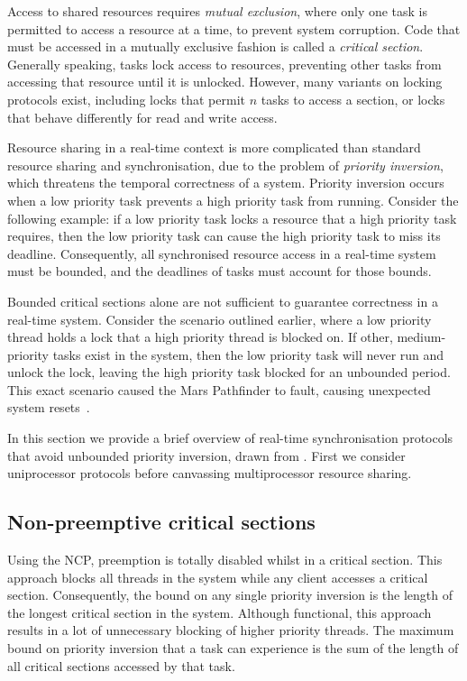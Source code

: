 Access to shared resources requires \emph{mutual exclusion}, where only one 
task is permitted to access a resource at a time, to prevent system corruption. Code that
must be accessed in a mutually exclusive fashion is called a \emph{critical section}. Generally
speaking, tasks lock access to resources, preventing other tasks from accessing that resource
until it is unlocked. However, many variants on locking protocols exist, including locks that permit
$n$ tasks to access a section, or locks that behave differently for read and write access.

Resource sharing in a real-time context is more complicated than standard resource sharing and
synchronisation, due to the problem of \emph{priority inversion}, which threatens the temporal
correctness of a system.  Priority inversion occurs when a low priority task prevents a high
priority task from running.  Consider the following example: if a low priority task locks a resource
that a high priority task requires, then the low priority task can cause the high priority task to
miss its deadline.  Consequently, all synchronised resource access in a real-time system must be
bounded, and the deadlines of tasks must account for those bounds.

Bounded critical sections alone are not sufficient to guarantee correctness in a real-time
system. Consider the scenario outlined earlier, where a low priority thread holds a lock that a high
priority thread is blocked on.  If other, medium-priority tasks exist in the system, then the low
priority task will never run and unlock the lock, leaving the high priority task blocked for an
unbounded period.  This exact scenario caused the Mars Pathfinder to fault, causing unexpected
system resets~\citep{Mars_Pathfinder}.

In this section we provide a brief overview of real-time synchronisation protocols that
avoid unbounded priority inversion, drawn from \citet{Sha_RL_90}. First we consider uniprocessor
protocols before canvassing multiprocessor resource sharing.

\subsection{Non-preemptive critical sections}

Using the \gls{NCP}, preemption is totally disabled whilst in a critical section.  This approach blocks
all threads in the system while any client accesses a critical section.  Consequently, the bound on
any single priority inversion is the length of the longest critical section in the system.  Although
functional, this approach results in a lot of unnecessary blocking of higher priority threads.  The
maximum bound on priority inversion that a task can experience is the sum of the length of all
critical sections accessed by that task. 

